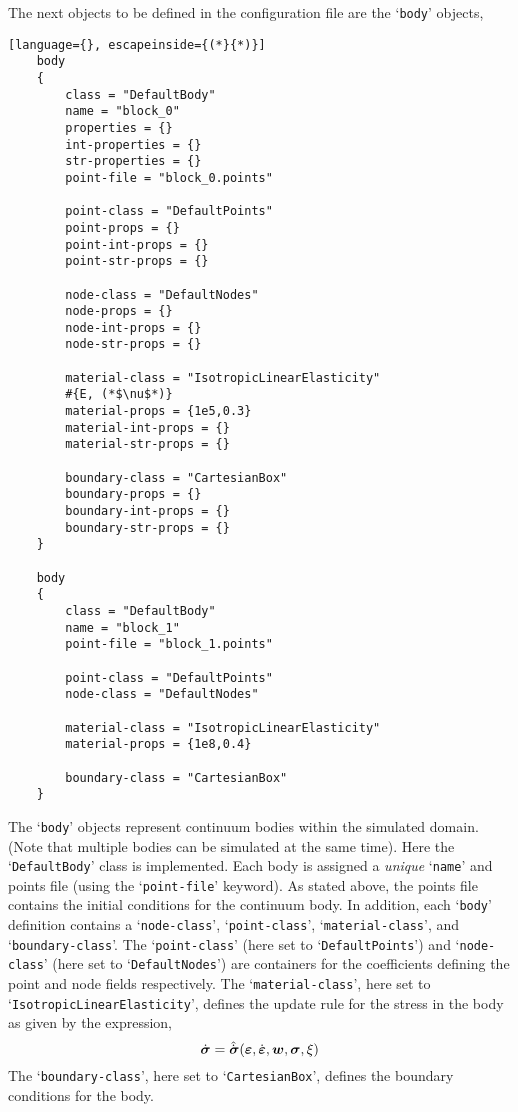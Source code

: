 The next objects to be defined in the configuration file are the `\texttt{body}' objects,
\begin{lstlisting}[language={}, escapeinside={(*}{*)}]
    body
    {
        class = "DefaultBody"
        name = "block_0"
        properties = {}
        int-properties = {}
        str-properties = {}
        point-file = "block_0.points"

        point-class = "DefaultPoints"
        point-props = {}
        point-int-props = {}
        point-str-props = {}

        node-class = "DefaultNodes"
        node-props = {}
        node-int-props = {}
        node-str-props = {}
        
        material-class = "IsotropicLinearElasticity"
        #{E, (*$\nu$*)}
        material-props = {1e5,0.3}
        material-int-props = {}
        material-str-props = {}
        
        boundary-class = "CartesianBox"
        boundary-props = {}
        boundary-int-props = {}
        boundary-str-props = {}
    }
    
    body
    {
        class = "DefaultBody"
        name = "block_1"
        point-file = "block_1.points"
        
        point-class = "DefaultPoints"
        node-class = "DefaultNodes"    

        material-class = "IsotropicLinearElasticity"
        material-props = {1e8,0.4}
        
        boundary-class = "CartesianBox"
    }
\end{lstlisting}
The `\texttt{body}' objects represent continuum bodies within the simulated domain. (Note that multiple bodies can be simulated at the same time). Here the `\texttt{DefaultBody}' class is implemented. Each body is assigned a \textit{unique} `\texttt{name}' and points file (using the `\texttt{point-file}' keyword). As stated above, the points file contains the initial conditions for the continuum body. In addition, each `\texttt{body}' definition contains a `\texttt{node-class}', `\texttt{point-class}', `\texttt{material-class}', and `\texttt{boundary-class}'. The `\texttt{point-class}' (here set to `\texttt{DefaultPoints}') and `\texttt{node-class}' (here set to `\texttt{DefaultNodes}') are containers for the coefficients defining the point and node fields respectively. The `\texttt{material-class}', here set to `\texttt{IsotropicLinearElasticity}', defines the update rule for the stress in the body as given by the expression,
\begin{equation} \label{eq:stress_pde}
\dot{\boldsymbol{\sigma}} = \hat{\dot{\boldsymbol{\sigma}}}(\boldsymbol{\varepsilon},\dot{\boldsymbol{\varepsilon}},\boldsymbol{w},\boldsymbol{\sigma},\xi)
\end{equation}
The `\texttt{boundary-class}', here set to `\texttt{CartesianBox}', defines the boundary conditions for the body.

